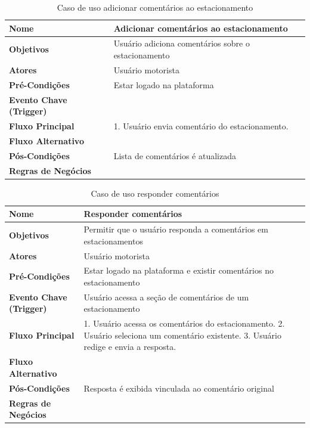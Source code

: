 \begin{table}[H]
\begin{center}
\caption{Caso de uso adicionar comentários ao estacionamento}
\label{tab:caso-uso-comentarios}
\begin{tabular}{|p{4cm}|p{9cm}|}
\hline
\textbf{Nome} & Adicionar comentários ao estacionamento \\
\hline
\textbf{Objetivos} & Usuário adiciona comentários sobre o estacionamento \\
\hline
\textbf{Atores} & Usuário motorista \\
\hline
\textbf{Pré-Condições} & Estar logado na plataforma \\
\hline
\textbf{Evento Chave (Trigger)} & \\
\hline
\textbf{Fluxo Principal} & 1. Usuário envia comentário do estacionamento. \\
\hline
\textbf{Fluxo Alternativo} & \\
\hline
\textbf{Pós-Condições} & Lista de comentários é atualizada \\
\hline
\textbf{Regras de Negócios} & \\
\hline
\end{tabular}
\end{center}
\end{table}

\begin{table}[H]
\begin{center}
\caption{Caso de uso responder comentários}
\label{tab:caso-uso-responder-comentarios}
\begin{tabular}{|p{4cm}|p{9cm}|}
\hline
\textbf{Nome} & Responder comentários \\
\hline
\textbf{Objetivos} & Permitir que o usuário responda a comentários em estacionamentos \\
\hline
\textbf{Atores} & Usuário motorista \\
\hline
\textbf{Pré-Condições} & Estar logado na plataforma e existir comentários no estacionamento \\
\hline
\textbf{Evento Chave (Trigger)} & Usuário acessa a seção de comentários de um estacionamento \\
\hline
\textbf{Fluxo Principal} & 1. Usuário acessa os comentários do estacionamento. 2. Usuário seleciona um comentário existente. 3. Usuário redige e envia a resposta. \\
\hline
\textbf{Fluxo Alternativo} & \\
\hline
\textbf{Pós-Condições} & Resposta é exibida vinculada ao comentário original \\
\hline
\textbf{Regras de Negócios} & \\
\hline
\end{tabular}
\end{center}
\end{table}


